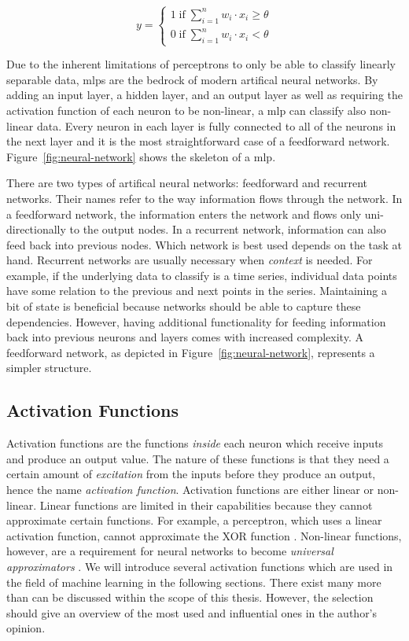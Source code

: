 \documentclass[draft,final]{vutinfth} %
\begin{document}
\begin{equation}
  \label{eq:perceptron}
  y =
  \begin{cases}
    1\;\mathrm{if}\;\sum_{i=1}^{n}w_i\cdot x_i\geq\theta \\
    0\;\mathrm{if}\;\sum_{i=1}^{n}w_i\cdot x_i<\theta
  \end{cases}
\end{equation}

Due to the inherent limitations of perceptrons to only be able to
classify linearly separable data, \glspl{mlp} are the bedrock of
modern artifical neural networks. By adding an input layer, a hidden
layer, and an output layer as well as requiring the activation
function of each neuron to be non-linear, a \gls{mlp} can classify
also non-linear data. Every neuron in each layer is fully connected to
all of the neurons in the next layer and it is the most
straightforward case of a feedforward
network. Figure~\ref{fig:neural-network} shows the skeleton of a
\gls{mlp}.

There are two types of artifical neural networks: feedforward and
recurrent networks. Their names refer to the way information flows
through the network. In a feedforward network, the information enters
the network and flows only uni-directionally to the output nodes. In a
recurrent network, information can also feed back into previous
nodes. Which network is best used depends on the task at
hand. Recurrent networks are usually necessary when \emph{context} is
needed. For example, if the underlying data to classify is a time
series, individual data points have some relation to the previous and
next points in the series. Maintaining a bit of state is beneficial
because networks should be able to capture these
dependencies. However, having additional functionality for feeding
information back into previous neurons and layers comes with increased
complexity. A feedforward network, as depicted in
Figure~\ref{fig:neural-network}, represents a simpler structure.

\subsection{Activation Functions}
\label{ssec:theory-activation-functions}

Activation functions are the functions \emph{inside} each neuron which
receive inputs and produce an output value. The nature of these
functions is that they need a certain amount of \emph{excitation} from
the inputs before they produce an output, hence the name
\emph{activation function}. Activation functions are either linear or
non-linear. Linear functions are limited in their capabilities because
they cannot approximate certain functions. For example, a perceptron,
which uses a linear activation function, cannot approximate the XOR
function \cite{minsky2017}. Non-linear functions, however, are a
requirement for neural networks to become \emph{universal
approximators} \cite{hornik1989}. We will introduce several activation
functions which are used in the field of machine learning in the
following sections. There exist many more than can be discussed within
the scope of this thesis. However, the selection should give an
overview of the most used and influential ones in the author's
opinion.
\end{document}
